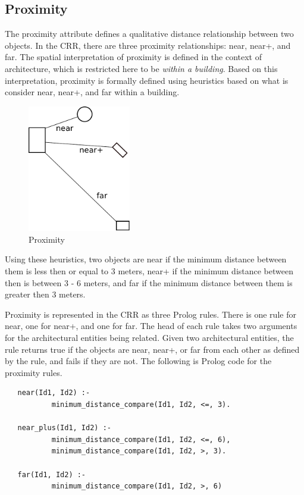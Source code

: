 \documentclass[12pt]{ucthesis}
\begin{document}
\subsection{Proximity}
The proximity attribute defines a qualitative distance relationship between two objects. In the CRR, there are three proximity relationships: near, near+, and far. The spatial interpretation of proximity is defined in the context of architecture, which is restricted here to be \emph{within a building}. Based on this interpretation, proximity is formally defined using heuristics based on what is consider near, near+, and far within a building.   


\begin{figure}[H]
\centering
\includegraphics[width=45mm]{proximity}
\caption{Proximity}
\label{proximity}
\end{figure}

Using these heuristics, two objects are near if the minimum distance between them is less then or equal to 3 meters, near+ if the minimum distance between then is between 3 - 6 meters, and far if the minimum distance between them is greater then 3 meters. %

Proximity is represented in the CRR as three Prolog rules. There is one rule for near, one for near+, and one for far. The head of each rule takes two arguments for the architectural entities being related. Given two architectural entities, the rule returns true if the objects are near, near+, or far from each other as defined by the rule, and fails if they are not. The following is Prolog code for the proximity rules.

\begin{verbatim}
   near(Id1, Id2) :- 
           minimum_distance_compare(Id1, Id2, <=, 3).
   
   near_plus(Id1, Id2) :-
           minimum_distance_compare(Id1, Id2, <=, 6),
           minimum_distance_compare(Id1, Id2, >, 3).   
   
   far(Id1, Id2) :- 
           minimum_distance_compare(Id1, Id2, >, 6)

\end{verbatim}
\end{document}
